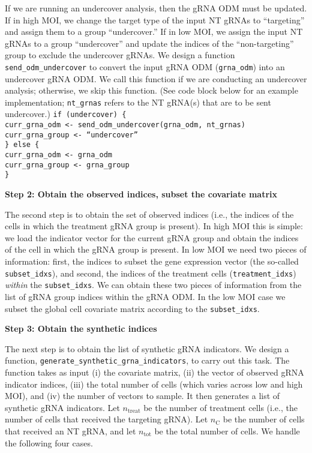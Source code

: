 \documentclass[12pt]{article}
\begin{document}
If we are running an undercover analysis, then the gRNA ODM must be updated. If in high MOI, we change the target type of the input NT gRNAs to ``targeting'' and assign them to a group ``undercover.'' If in low MOI, we assign the input NT gRNAs to a group ``undercover'' and update the indices of the ``non-targeting'' group to exclude the undercover gRNAs. We design a function \texttt{send\_odm\_undercover} to convert the input gRNA ODM (\texttt{grna\_odm}) into an undercover gRNA ODM. We call this function if we are conducting an undercover analysis; otherwise, we skip this function. (See code block below for an example implementation; \texttt{nt\_grnas} refers to the NT gRNA(s) that are to be sent undercover.)
\newline \newline
\noindent
\texttt{if (undercover) \{\\
	curr\_grna\_odm <- send\_odm\_undercover(grna\_odm, \texttt{nt\_grnas}) \\
	curr\_grna\_group <- ``undercover''
	\\ \} else \{ \\ curr\_grna\_odm <- grna\_odm \\ curr\_grna\_group <- grna\_group \\ \}}

\begin{center}
\textbf{Step 2: Obtain the observed indices, subset the covariate matrix}
\end{center}

The second step is to obtain the set of observed indices (i.e., the indices of the cells in which the treatment gRNA group is present). In high MOI this is simple: we load the indicator vector for the current gRNA group and obtain the indices of the cell in which the gRNA group is present. In low MOI we need two pieces of information: first, the indices to subset the gene expression vector (the so-called \texttt{subset\_idxs}), and second, the indices of the treatment cells (\texttt{treatment\_idxs}) \textit{within} the \texttt{subset\_idxs}. We can obtain these two pieces of information from the list of gRNA group indices within the gRNA ODM. In the low MOI case we subset the global cell covariate matrix according to the \texttt{subset\_idxs}.

\begin{center}
\textbf{Step 3: Obtain the synthetic indices}
\end{center}

The next step is to obtain the list of synthetic gRNA indicators. We design a function, \texttt{generate\_synthetic\_grna\_indicators}, to carry out this task. The function takes as input (i) the covariate matrix, (ii) the vector of observed gRNA indicator indices, (iii) the total number of cells (which varies across low and high MOI), and (iv) the number of vectors to sample. It then generates a list of synthetic gRNA indicators. Let $n_\textrm{treat}$ be the number of treatment cells (i.e., the number of cells that received the targeting gRNA). Let $n_\textrm{C}$ be the number of cells that received an NT gRNA, and let $n_\textrm{tot}$ be the total number of cells. We handle the following four cases.
\end{document}
